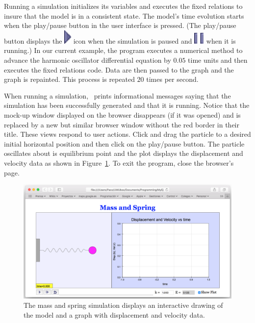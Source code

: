 Running a simulation initializes its variables and executes the fixed relations to insure that the model is in a consistent state.  The model's time evolution starts when the play/pause button in the user interface is pressed. (The play/pause button displays the \includegraphics[scale=\linescale]{../_common/icons_png/play.png} icon when the simulation is paused and \includegraphics[scale=\linescale]{../_common/icons_png/pause.png} when it is running.) In our current example, the program executes a numerical method to advance the harmonic oscillator differential equation by $0.05$ time units and then executes the fixed relations code.  Data are then passed to the graph and the graph is repainted. This process is repeated $20$ times per second.

When running a simulation, \ejs\ prints informational messages saying that the
simulation has been successfully generated and that it is running. Notice that the  mock-up window displayed on the browser disappears (if it was opened) and is 
replaced by a new but similar browser window without the red border in their title. These views respond to user
actions. Click and drag the particle to a desired initial horizontal position and then click on the play/pause button.
The particle oscillates about is equilibrium point and the plot displays the displacement and velocity data as shown in
Figure~\ref{fig:03ExplorationJavascript/SpringRunning}.
To exit the program, close the browser's page.

\begin{figure}[htb]
  \centering
  \includegraphics[scale=\scale]{03ExplorationJavascript/images/SpringRunning.png}
  \caption{The mass and spring simulation displays an interactive drawing of the model and a graph with displacement and velocity data.}
  \label{fig:03ExplorationJavascript/SpringRunning}
\end{figure}

